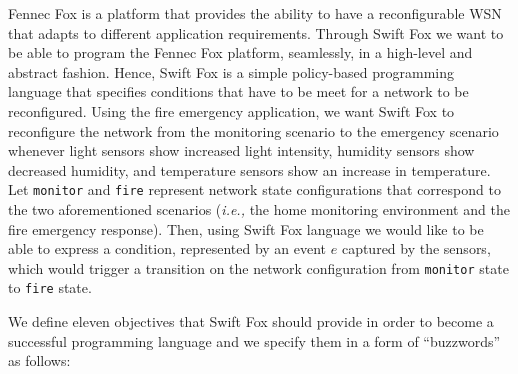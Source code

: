 \documentclass[11pt]{article}
\begin{document}
Fennec Fox is a platform that provides the ability to have a reconfigurable
WSN that adapts to different application requirements. Through Swift Fox
we want to be able to program the Fennec Fox platform, seamlessly, in a
high-level and abstract fashion. Hence, Swift Fox is a simple policy-based 
programming language that specifies conditions that have to be meet for a
network to be reconfigured. Using the fire emergency application, we want
Swift Fox to reconfigure the network from the monitoring scenario to the
emergency scenario whenever light sensors show increased light intensity,
humidity sensors show decreased humidity, and temperature sensors show an
increase in temperature. Let \texttt{monitor} and \texttt{fire} represent
network state configurations that correspond to the two aforementioned
scenarios (\textit{i.e.,} the home monitoring environment and the fire
emergency response). Then, using Swift Fox language we would like to be
able to express a condition, represented by an event $e$ captured by
the sensors, which would trigger a transition on the network configuration 
from \texttt{monitor} state to \texttt{fire} state. 

We define eleven objectives that Swift Fox should provide in order to
become a successful programming language and we specify them in a form of
``buzzwords'' as follows:
\end{document}
